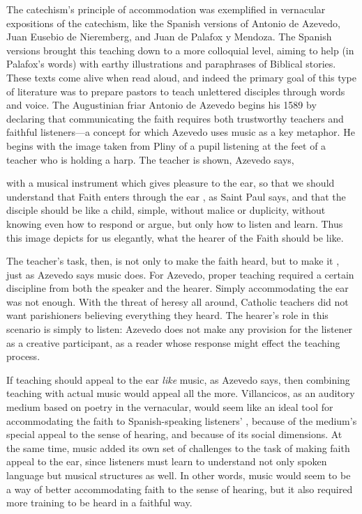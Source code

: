 The catechism's principle of accommodation was exemplified in vernacular
expositions of the catechism, like the Spanish versions of Antonio de Azevedo,
Juan Eusebio de Nieremberg, and Juan de Palafox y Mendoza.%
    \Autocites
    {Azevedo:Catecismo}
    {Nieremberg:PracticaCatecismo}
    {Palafox:Bocados}
The Spanish versions brought this teaching down to a more colloquial level,
aiming to help  (in Palafox's words) with
earthy illustrations and paraphrases of Biblical stories.
These texts come alive when read aloud, and indeed the primary goal of this type
of literature was to prepare pastors to teach unlettered disciples through words
and voice.
The Augustinian friar Antonio de Azevedo begins his 1589  by declaring that communicating the faith requires
both trustworthy teachers and faithful listeners---a concept for which Azevedo
uses music as a key metaphor.%
    \Autocite{Azevedo:Catecismo}
He begins with the image taken from Pliny of a pupil listening at the feet of a
teacher who is holding a harp.
The teacher is shown, Azevedo says,
\begin{quoting}
    with a musical instrument which gives pleasure to the ear, so that we should
    understand that Faith enters through the ear , as Saint Paul
    says, and that the disciple should be like a child, simple, without malice
    or duplicity, without knowing even how to respond or argue, but only how to
    listen and learn.
    Thus this image depicts for us elegantly, what the hearer of the Faith
    should be like.%
        \Autocite[]{Azevedo:Catecismo}
\end{quoting}
The teacher's task, then, is not only to make the faith heard, but to make it
, just as Azevedo says music does.
For Azevedo, proper teaching required a certain discipline from both the speaker
and the hearer.
Simply accommodating the ear was not enough.
With the threat of heresy all around, Catholic teachers did not want
parishioners believing everything they heard.
The hearer's role in this scenario is simply to listen: Azevedo does not make
any provision for the listener as a creative participant, as a reader whose
response might effect the teaching process.

If teaching should appeal to the ear \emph{like} music, as Azevedo says, then
combining teaching with actual music would appeal all the more.
Villancicos, as an auditory medium based on poetry in the vernacular, would seem
like an ideal tool for accommodating the faith to Spanish-speaking listeners'
, because of the medium's special appeal to the
sense of hearing, and because of its social dimensions.
At the same time, music added its own set of challenges to the task of making
faith appeal to the ear, since listeners must learn to understand not only
spoken language but musical structures as well.
In other words, music would seem to be a way of better accommodating faith to
the sense of hearing, but it also required more training to be heard in a
faithful way.

